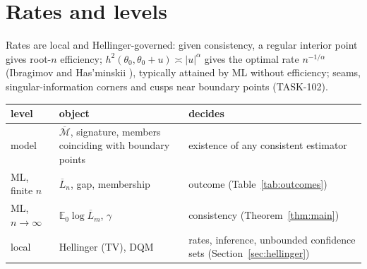 \documentclass[11pt]{article}
\newcommand{\E}{\mathbb E}
\newcommand{\bM}{\overline{\mathcal M}}
\newcommand{\bL}{\overline L}
\theoremstyle{definition}
\theoremstyle{remark}
\begin{document}
\section{Rates and levels}
Rates are local and Hellinger-governed: given consistency, a regular
interior point gives root-$n$ efficiency; $h^2(\theta_0,\theta_0+u)\asymp
|u|^\alpha$ gives the optimal rate $n^{-1/\alpha}$ (Ibragimov and
Has'minskii \cite{ih}), typically attained by ML without efficiency; seams,
singular-information corners and cusps near boundary points (TASK-102).

\begin{center}\small
\begin{tabular}{@{}p{2.6cm}p{5.6cm}p{6cm}@{}}
\toprule
level & object & decides\\
\midrule
model & $\bM$, signature, members coinciding with boundary points & existence of any consistent estimator \cite{lecamschwartz}\\
ML, finite $n$ & $\bL_n$, gap, membership & outcome (Table~\ref{tab:outcomes})\\
ML, $n\to\infty$ & $\E_0\log\bL_m$, $\gamma$ & consistency (Theorem~\ref{thm:main})\\
local & Hellinger (TV), DQM & rates, inference, unbounded confidence sets (Section~\ref{sec:hellinger})\\
\bottomrule
\end{tabular}
\end{center}
\end{document}
